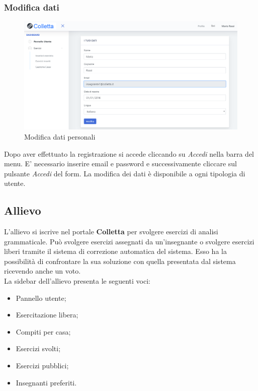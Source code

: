     \subsubsection{Modifica dati}
    	\begin{figure}[H]
        	\centering
        	\includegraphics[width=1\linewidth]{sez/img/autenticazione/modati.PNG} 
        	\caption{Modifica dati personali}\label{fig:1}
    	\end{figure}
    Dopo aver effettuato la registrazione si accede cliccando su \textit{Accedi} nella barra del menu. E' necessario inserire email e password e successivamente cliccare sul pulsante \textit{Accedi} del form. La modifica dei dati è disponibile a ogni tipologia di utente.

\newpage
    \subsection{Allievo}
      L'allievo si iscrive nel portale \textbf{Colletta} per svolgere esercizi di analisi grammaticale. Può svolgere esercizi assegnati da un'insegnante o svolgere esercizi liberi tramite il sistema di correzione automatica del sistema. Esso ha la possibilità di confrontare la sua soluzione con quella presentata dal sistema ricevendo anche un voto.
      \\La sidebar dell'allievo presenta le seguenti voci:
            \begin{itemize}
                \item Pannello utente;
                \item Esercitazione libera;
                \item Compiti per casa;
                \item Esercizi svolti;
                \item Esercizi pubblici;
                \item Insegnanti preferiti.
            \end{itemize}
            

